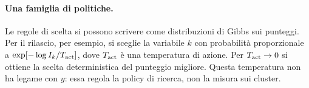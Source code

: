 \paragraph{Una famiglia di politiche.}
Le regole di scelta si possono scrivere come distribuzioni di Gibbs sui punteggi.
Per il rilascio, per esempio, si sceglie la variabile $k$ con probabilità proporzionale a $\exp[-\log I_k/T_{\mathrm{act}}]$, dove $T_{\mathrm{act}}$ è una temperatura di azione.
Per $T_{\mathrm{act}}\to0$ si ottiene la scelta deterministica del punteggio migliore.
Questa temperatura non ha legame con $y$: essa regola la policy di ricerca, non la misura sui cluster.
